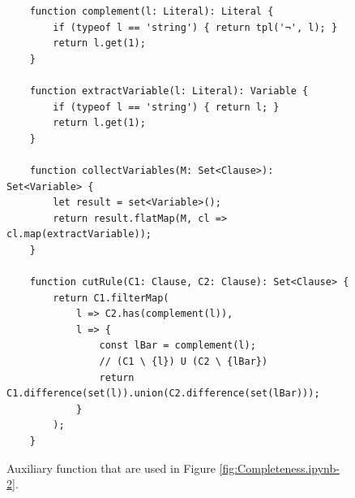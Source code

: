 \begin{figure}[!ht]
\centering
\begin{verbatim}
    function complement(l: Literal): Literal {
        if (typeof l == 'string') { return tpl('¬', l); } 
        return l.get(1);
    }
    
    function extractVariable(l: Literal): Variable {
        if (typeof l == 'string') { return l; } 
        return l.get(1);
    }
      
    function collectVariables(M: Set<Clause>): Set<Variable> {
        let result = set<Variable>();
        return result.flatMap(M, cl => cl.map(extractVariable));
    }
    
    function cutRule(C1: Clause, C2: Clause): Set<Clause> {
        return C1.filterMap(
            l => C2.has(complement(l)),
            l => {
                const lBar = complement(l);
                // (C1 \ {l}) U (C2 \ {lBar})
                return C1.difference(set(l)).union(C2.difference(set(lBar)));
            }
        );
    }
\end{verbatim}
\vspace*{-0.3cm}
\caption{Auxiliary function that are used in Figure \ref{fig:Completeness.ipynb-2}.}
\label{fig:Completeness.ipynb-1}
\end{figure}

